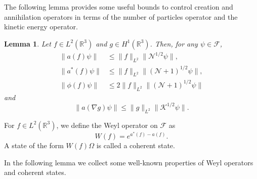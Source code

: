 \documentclass[11pt,a4paper,draft,DIV11]{scrartcl}	%
\newtheorem{lem}[thm]{Lemma}
\newcommand{\R}{\mathds{R}}
\newcommand{\N}{\mathcal{N}}
\newcommand{\Ncal}{\mathcal{N}}		%
\newcommand{\Kcal}{\mathcal{K}}		%
\newcommand{\norm}[1]{\lVert#1\rVert}	%
\newcommand{\be}[1]{\begin{equation}\label{eq:#1}}	%
\newcommand{\ee}{\end{equation}}
\begin{document}
The following lemma provides some useful bounds to control creation and
annihilation operators in terms of the number of particles operator and the
kinetic energy operator.


\begin{lem} \label{l:a}
  Let $f \in L^2(\R^3)$ and $g \in H^1(\R^3)$. Then, for any $\psi \in
  \mathcal{F}$,
  \begin{equation} \label{aNorm}
    \begin{aligned}
      \norm{a(f)\psi} & \leq \norm{f}_{L^2} \norm{\Ncal^{1/2}\psi}, \\
      \norm{a^*(f)\psi} & \leq \norm{f}_{L^2} \norm{(\Ncal+1)^{1/2}\psi}, \\
      \norm{\phi(f) \psi} & \leq 2 \norm{f}_{L^2} \norm{(\N+1)^{1/2} \psi}
    \end{aligned}
  \end{equation}
and
\be{agradnorm}
\norm{a(\nabla g)\psi}  \leq \norm{g}_{L^2} \norm{\Kcal^{1/2}\psi}.
\ee
\end{lem}

For $f \in L^2(\R^3)$, we define the Weyl operator on $\mathcal{F}$ as
\[
  W(f) = e^{a^*(f) - a(f)}.
\]
A state of the form $W(f)\Omega$ is called a coherent state.


In the following lemma we collect some well-known properties of Weyl operators
and coherent states.
\end{document}
